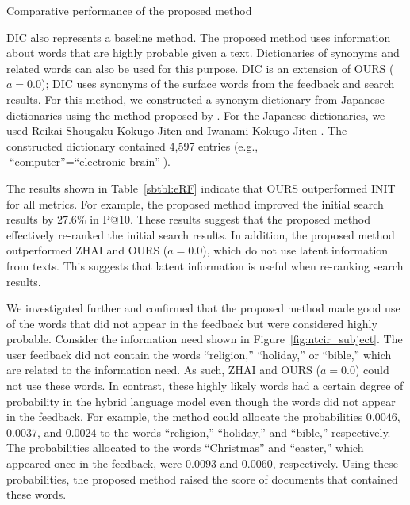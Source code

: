 \documentclass[english]{jnlp_1.4_rep}
\begin{document}
\begin{table}[b]
\vspace{0.5\Cvs}
  \caption{Comparative performance of the proposed method}
\label{tbl:experiment1}

\end{table}

DIC also represents a baseline method. The proposed method uses
information about words that are highly probable given a
text. Dictionaries of synonyms and related words can also be used for
this purpose. DIC is an extension of OURS ($a = 0.0$); DIC uses synonyms
of the surface words from the feedback and search results. For this
method, we constructed a synonym dictionary from Japanese dictionaries
    using the method proposed by . For
the Japanese dictionaries, we used Reikai Shougaku Kokugo
Jiten \cite{Tajika2001} and Iwanami Kokugo Jiten \cite{Nishio2002}. The
constructed dictionary contained 4,597 entries (e.g., $\text{``computer''} =
\text{``electronic brain''}$).

The results shown in Table~\ref{sbtbl:eRF} indicate that OURS
outperformed INIT for all metrics. For example, the proposed method
improved the initial search results by $27.6\%$ in P@10. These results
suggest that the proposed method effectively re-ranked the initial
search results. In addition, the proposed method outperformed ZHAI and
OURS ($a = 0.0$), which do not use latent information from texts. This
suggests that latent information is useful when re-ranking search
results.

We investigated further and confirmed that the proposed method made good
use of the words that did not appear in the feedback but were considered
highly probable. Consider the information need shown in
Figure~\ref{fig:ntcir_subject}. The user feedback did not contain the
words ``religion,'' ``holiday,'' or ``bible,'' which are related to the
information need. As such, ZHAI and OURS ($a = 0.0$) could not use these
words. In contrast, these highly likely words had a certain degree of
probability in the hybrid language model even though the words did not
appear in the feedback. For example, the method could allocate the
probabilities $0.0046$, $0.0037$, and $0.0024$ to the words
``religion,'' ``holiday,'' and ``bible,'' respectively. The
probabilities allocated to the words ``Christmas'' and ``easter,'' which
appeared once in the feedback, were $0.0093$ and $0.0060$,
respectively. Using these probabilities, the proposed method raised the
score of documents that contained these words.
\end{document}
